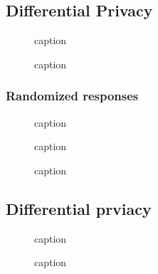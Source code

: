 \documentclass[11pt]{article}
\begin{document}
\subsection{Differential Privacy}

\begin{figure}[H]
    \centering
    \caption{caption}
\end{figure}

\begin{figure}[H]
    \centering
    \caption{caption}
\end{figure}

\subsubsection{Randomized responses}

\begin{figure}[H]
    \centering
    \caption{caption}
\end{figure}

\begin{figure}[H]
    \centering
    \caption{caption}
\end{figure}

\begin{figure}[H]
    \centering
    \caption{caption}
\end{figure}

\subsection{Differential prviacy}

\begin{figure}[H]
    \centering
    \caption{caption}
\end{figure}

\begin{figure}[H]
    \centering
    \caption{caption}
\end{figure}
\end{document}
